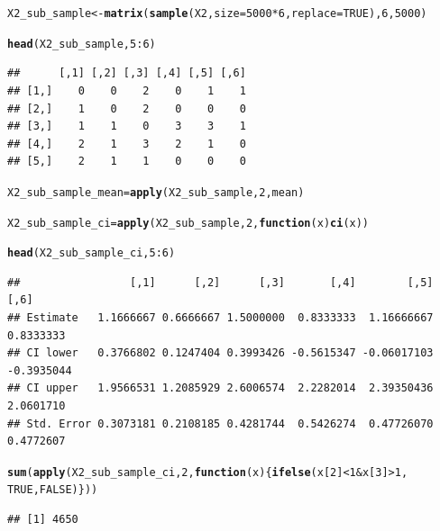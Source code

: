 \documentclass{article}\usepackage[]{graphicx}\usepackage[]{color}
\makeatletter
\newcommand{\hlnum}[1]{\textcolor[rgb]{0.686,0.059,0.569}{#1}}%
\newcommand{\hlopt}[1]{\textcolor[rgb]{0,0,0}{#1}}%
\newcommand{\hlstd}[1]{\textcolor[rgb]{0.345,0.345,0.345}{#1}}%
\newcommand{\hlkwa}[1]{\textcolor[rgb]{0.161,0.373,0.58}{\textbf{#1}}}%
\newcommand{\hlkwb}[1]{\textcolor[rgb]{0.69,0.353,0.396}{#1}}%
\newcommand{\hlkwc}[1]{\textcolor[rgb]{0.333,0.667,0.333}{#1}}%
\newcommand{\hlkwd}[1]{\textcolor[rgb]{0.737,0.353,0.396}{\textbf{#1}}}%
\newenvironment{kframe}{%
 \def\at@end@of@kframe{}%
 \ifinner\ifhmode%
  \def\at@end@of@kframe{\end{minipage}}%
  \begin{minipage}{\columnwidth}%
 \fi\fi%
 \def\FrameCommand##1{\hskip\@totalleftmargin \hskip-\fboxsep
 \colorbox{shadecolor}{##1}\hskip-\fboxsep
     \hskip-\linewidth \hskip-\@totalleftmargin \hskip\columnwidth}%
 \MakeFramed {\advance\hsize-\width
   \@totalleftmargin\z@ \linewidth\hsize
   \@setminipage}}%
 {\par\unskip\endMakeFramed%
 \at@end@of@kframe}
\newenvironment{knitrout}{}{} %
\makeatother
\begin{document}
\begin{knitrout}
\color{fgcolor}\begin{kframe}
\begin{alltt}
\hlstd{X2_sub_sample} \hlkwb{<-} \hlkwd{matrix}\hlstd{(}\hlkwd{sample}\hlstd{(X2,} \hlkwc{size} \hlstd{=} \hlnum{5000} \hlopt{*}\hlnum{6}\hlstd{,} \hlkwc{replace} \hlstd{=} \hlnum{TRUE}\hlstd{),}\hlnum{6}\hlstd{,} \hlnum{5000}\hlstd{)}

\hlkwd{head}\hlstd{(X2_sub_sample,}\hlnum{5}\hlopt{:}\hlnum{6}\hlstd{)}
\end{alltt}
\begin{verbatim}
##      [,1] [,2] [,3] [,4] [,5] [,6]
## [1,]    0    0    2    0    1    1
## [2,]    1    0    2    0    0    0
## [3,]    1    1    0    3    3    1
## [4,]    2    1    3    2    1    0
## [5,]    2    1    1    0    0    0
\end{verbatim}
\begin{alltt}
\hlstd{X2_sub_sample_mean} \hlkwb{=} \hlkwd{apply}\hlstd{(X2_sub_sample,} \hlnum{2}\hlstd{, mean)}

\hlstd{X2_sub_sample_ci} \hlkwb{=} \hlkwd{apply}\hlstd{(X2_sub_sample,} \hlnum{2}\hlstd{,} \hlkwa{function}\hlstd{(}\hlkwc{x}\hlstd{)} \hlkwd{ci}\hlstd{(x))}

\hlkwd{head}\hlstd{(X2_sub_sample_ci,}\hlnum{5}\hlopt{:}\hlnum{6}\hlstd{)}
\end{alltt}
\begin{verbatim}
##                 [,1]      [,2]      [,3]       [,4]        [,5]       [,6]
## Estimate   1.1666667 0.6666667 1.5000000  0.8333333  1.16666667  0.8333333
## CI lower   0.3766802 0.1247404 0.3993426 -0.5615347 -0.06017103 -0.3935044
## CI upper   1.9566531 1.2085929 2.6006574  2.2282014  2.39350436  2.0601710
## Std. Error 0.3073181 0.2108185 0.4281744  0.5426274  0.47726070  0.4772607
\end{verbatim}
\begin{alltt}
\hlkwd{sum}\hlstd{(}\hlkwd{apply}\hlstd{(X2_sub_sample_ci,} \hlnum{2}\hlstd{,} \hlkwa{function}\hlstd{(}\hlkwc{x}\hlstd{)\{}\hlkwd{ifelse}\hlstd{(x[}\hlnum{2}\hlstd{]} \hlopt{<} \hlnum{1} \hlopt{&} \hlstd{x[}\hlnum{3}\hlstd{]} \hlopt{>} \hlnum{1}\hlstd{,}
                                                  \hlnum{TRUE}\hlstd{,} \hlnum{FALSE}\hlstd{)\}))}
\end{alltt}
\begin{verbatim}
## [1] 4650
\end{verbatim}
\end{kframe}
\end{knitrout}
\end{document}

